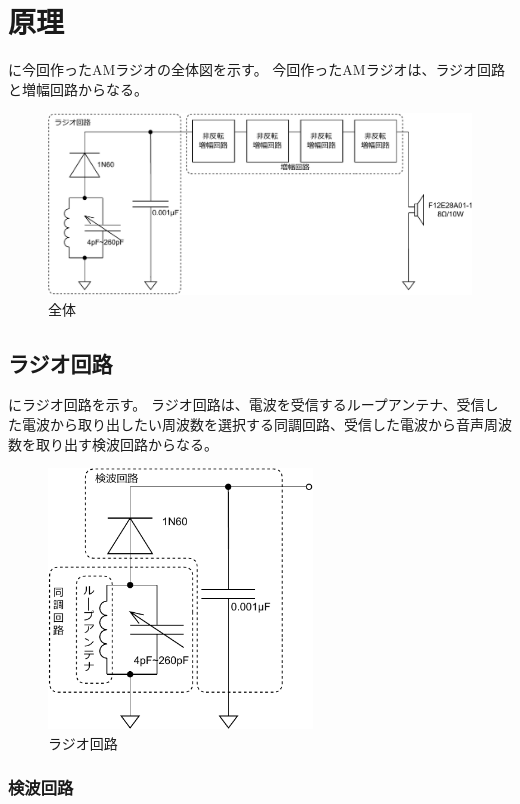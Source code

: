 \documentclass[report.tex]{subfiles}
\begin{document}
\section{原理}

に今回作ったAMラジオの全体図を示す。
今回作ったAMラジオは、ラジオ回路と増幅回路からなる。

\begin{figure}[H]
	\centering
	\includegraphics[width=14cm]{fig/all2.pdf}
	\caption{全体}
	\label{fig:all2}
\end{figure}

\subsection{ラジオ回路}

にラジオ回路を示す。
ラジオ回路は、電波を受信するループアンテナ、受信した電波から取り出したい周波数を選択する同調回路、受信した電波から音声周波数を取り出す検波回路からなる。

\begin{figure}[H]
	\centering
	\includegraphics[width=7cm]{fig/radio.pdf}
	\caption{ラジオ回路}
	\label{fig:radio}
\end{figure}

\subsubsection{検波回路}
\end{document}
